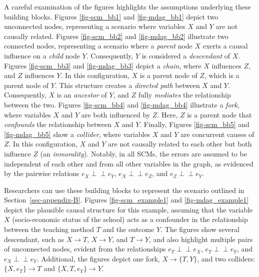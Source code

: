 \documentclass[
  authoryear,
  review,
  1p]{elsarticle}
\begin{document}
A careful examination of the figures highlights the assumptions
underlying these building blocks. Figures \ref{fig-scm_bb1} and
\ref{fig-mdag_bb1} depict two unconnected nodes, representing a scenario
where variables \(X\) and \(Y\) are not causally related. Figures
\ref{fig-scm_bb2} and \ref{fig-mdag_bb2} illustrate two connected nodes,
representing a scenario where a \emph{parent} node \(X\) exerts a causal
influence on a \emph{child} node \(Y\). Consequently, \(Y\) is
considered a \emph{descendant} of \(X\). Figures \ref{fig-scm_bb3} and
\ref{fig-mdag_bb3} depict a \emph{chain}, where \(X\) influences \(Z\),
and \(Z\) influences \(Y\). In this configuration, \(X\) is a parent
node of \(Z\), which is a parent node of \(Y\). This structure creates a
\emph{directed path} between \(X\) and \(Y\). Consequently, \(X\) is an
\emph{ancestor} of \(Y\), and \(Z\) fully \emph{mediates} the
relationship between the two. Figures \ref{fig-scm_bb4} and
\ref{fig-mdag_bb4} illustrate a \emph{fork}, where variables \(X\) and
\(Y\) are both influenced by \(Z\). Here, \(Z\) is a parent node that
\emph{confounds} the relationship between \(X\) and \(Y\). Finally,
Figures \ref{fig-scm_bb5} and \ref{fig-mdag_bb5} show a \emph{collider},
where variables \(X\) and \(Y\) are concurrent causes of \(Z\). In this
configuration, \(X\) and \(Y\) are not causally related to each other
but both influence \(Z\) (an \emph{inmorality}). Notably, in all SCMs,
the errors are assumed to be independent of each other and from all
other variables in the graph, as evidenced by the pairwise relations
\(e_{X} \perp\!\!\!\perp e_{Y}\), \(e_{X} \perp\!\!\!\perp e_{Z}\), and
\(e_{Z} \perp\!\!\!\perp e_{Y}\).

Researchers can use these building blocks to represent the scenario
outlined in Section~\ref{sec-appendix-B}. Figures \ref{fig-scm_example1}
and \ref{fig-mdag_example1} depict the plausible causal structure for
this example, assuming that the variable \(X\) (socio-economic status of
the school) acts as a confounder in the relationship between the
teaching method \(T\) and the outcome \(Y\). The figures show several
descendant, such as \(X \rightarrow T\), \(X \rightarrow Y\), and
\(T \rightarrow Y\), and also highlight multiple pairs of unconnected
nodes, evident from the relationships \(e_{T} \perp\!\!\!\perp e_{X}\),
\(e_{T} \perp\!\!\!\perp e_{Y}\), and \(e_{X} \perp\!\!\!\perp e_{Y}\).
Additional, the figures depict one fork, \(X \rightarrow \{T, Y\}\), and
two colliders: \(\{X, e_{T}\} \rightarrow T\) and
\(\{X, T, e_{Y}\} \rightarrow Y\).
\end{document}
